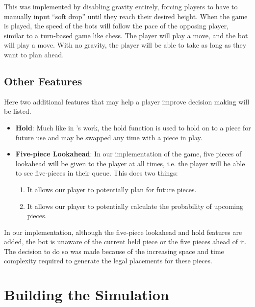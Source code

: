 \documentclass[a4paper, 12pt]{extreport}
\begin{document}
	This was implemented by disabling gravity entirely, forcing players to have to manually input ``soft drop'' until they reach their desired height. When the game is played, the speed of the bots will follow the pace of the opposing player, similar to a turn-based game like chess. The player will play a move, and the bot will play a move. With no gravity, the player will be able to take as long as they want to plan ahead.
	
	\subsection{Other Features}\label{subsec:other-feats}
	
	Here two additional features that may help a player improve decision making will be listed.
	
	\begin{itemize}
		\item \textbf{Hold}: Much like in \citeauthor{tetris-drl-2}'s \cite{tetris-drl-2} work, the hold function is used to hold on to a piece for future use and may be swapped any time with a piece in play.
		\item \textbf{Five-piece Lookahead}: In our implementation of the game, five pieces of lookahead will be given to the player at all times, i.e. the player will be able to see five-pieces in their queue. This does two things:
		\begin{enumerate}
			\item It allows our player to potentially plan for future pieces.
			\item It allows our player to potentially calculate the probability of upcoming pieces.
		\end{enumerate}
	\end{itemize}
	
	In our implementation, although the five-piece lookahead and hold features are added, the bot is unaware of the current held piece or the five pieces ahead of it. The decision to do so was made because of the increasing space and time complexity required to generate the legal placements for these pieces.
	
	\section{Building the Simulation}\label{sec:sim-building}
%	
\end{document}
